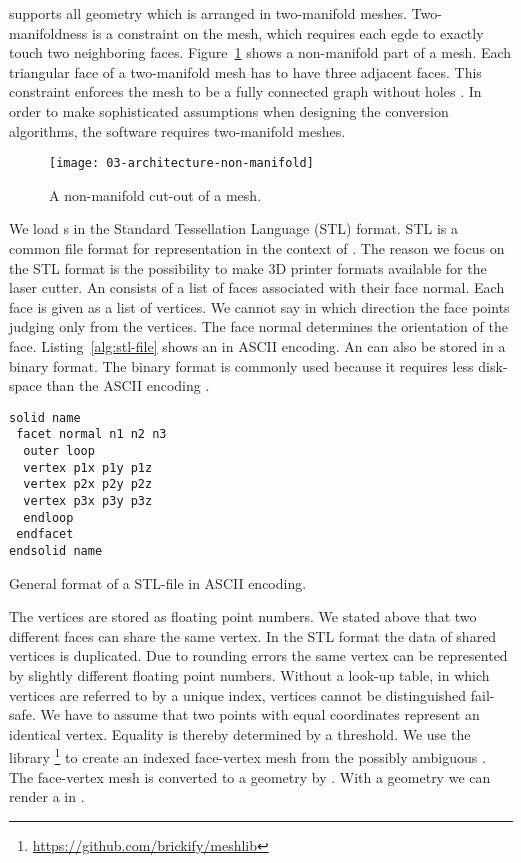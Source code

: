 \documentclass[../../ClassicThesis.tex]{subfiles}
\begin{document}
{\platener} supports all geometry which is arranged in two-manifold
meshes. Two-manifoldness is a constraint on the mesh, which requires
each egde to exactly touch two neighboring faces.
Figure~\ref{fig:non-manifold} shows a non-manifold part of a mesh.
Each triangular face of a two-manifold mesh has to have three adjacent
faces. This constraint enforces the mesh to be a fully connected graph
without holes \cite[p.~28]{master-thesis}. In order to make
sophisticated assumptions when designing the conversion algorithms,
the software requires two-manifold meshes.

\begin{figure}[h]
  \centering
  \texttt{[image: 03-architecture-non-manifold]}
  \caption{A non-manifold cut-out of a mesh.}
  \label{fig:non-manifold}
\end{figure}

We load {\threedmodel}s in the Standard Tessellation
Language (STL) format. STL is a common file format for
{\threedmodel} representation in the context of
{\threedprinting}. The reason we focus on the STL format is
the possibility to make 3D printer formats available for the
laser cutter. An {\stlfile} consists of a list of faces
associated with their face normal. Each face is given as a
list of vertices. We cannot say in which direction the face
points judging only from the vertices. The face normal
determines the orientation of the face.
Listing~\ref{alg:stl-file} shows an {\stlfile} in ASCII
encoding. An {\stlfile} can also be stored in a binary
format. The binary format is commonly used because it
requires less disk-space than the ASCII encoding
\cite[p.~8]{stl-file}.

\begin{listing}
\begin{verbatim}
solid name
 facet normal n1 n2 n3
  outer loop
  vertex p1x p1y p1z
  vertex p2x p2y p2z
  vertex p3x p3y p3z
  endloop
 endfacet
endsolid name
\end{verbatim}
\caption{General format of a STL-file in ASCII encoding.}
\label{alg:stl-file}
\end{listing}

The vertices are stored as floating point numbers. We stated
above that two different faces can share the same vertex. In
the STL format the data of shared vertices is duplicated.
Due to rounding errors the same vertex can be represented by
slightly different floating point numbers. Without a look-up
table, in which vertices are referred to by a unique index,
vertices cannot be distinguished fail-safe. We have to
assume that two points with equal coordinates represent an
identical vertex. Equality is thereby determined by a
threshold. We use the library
{\meshlib}\footnote{\url{https://github.com/brickify/meshlib}}
to create an indexed face-vertex mesh from the possibly
ambiguous {\stlfile}. The face-vertex mesh is converted to a
{\threejs} geometry by {\meshlib}. With a {\threejs}
geometry we can render a {\threedmodel} in {\convertify}.
\end{document}
